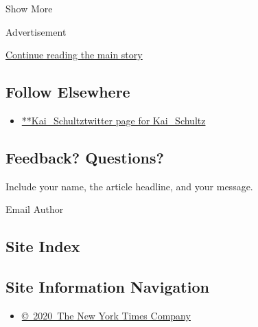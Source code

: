 Show More

Advertisement

\protect\hyperlink{after-mid2}{Continue reading the main story}

\hypertarget{follow-elsewhere}{%
\subsection{Follow Elsewhere}\label{follow-elsewhere}}

\begin{itemize}
\tightlist
\item
  \href{https://twitter.com/Kai_Schultz}{**Kai\_Schultztwitter page for
  Kai\_Schultz}
\end{itemize}

\hypertarget{feedback-questions}{%
\subsection{Feedback? Questions?}\label{feedback-questions}}

Include your name, the article headline, and your message.

Email Author

\hypertarget{site-index}{%
\subsection{Site Index}\label{site-index}}

\hypertarget{site-information-navigation}{%
\subsection{Site Information
Navigation}\label{site-information-navigation}}

\begin{itemize}
\tightlist
\item
  \href{https://help.nytimes3xbfgragh.onion/hc/en-us/articles/115014792127-Copyright-notice}{©~2020~The
  New York Times Company}
\end{itemize}

